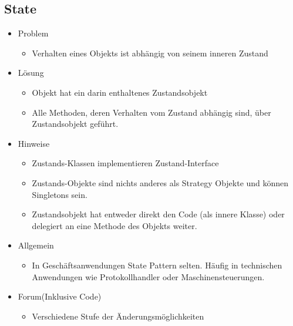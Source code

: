\documentclass[../ZF_SWEN1.tex]{subfiles}
\begin{document}
\subsection{State}
\begin{itemize}
	\item Problem
	\begin{itemize}
		\item Verhalten eines Objekts ist abhängig von seinem inneren Zustand
	\end{itemize}
	\item Lösung
	\begin{itemize}
		\item Objekt hat ein darin enthaltenes Zustandsobjekt
		\item Alle Methoden, deren Verhalten vom Zustand abhängig sind, über Zustandsobjekt geführt.
	\end{itemize}
	\item Hinweise
	\begin{itemize}
		\item Zustands-Klassen implementieren Zustand-Interface
		\item Zustands-Objekte sind nichts anderes als Strategy Objekte und können Singletons sein.
		\item Zustandsobjekt hat entweder direkt den Code (als innere Klasse) oder delegiert an eine Methode des Objekts weiter.
	\end{itemize}
	\item Allgemein
	\begin{itemize}
		\item In Geschäftsanwendungen State Pattern selten. Häufig in technischen Anwendungen wie Protokollhandler oder Maschinensteuerungen.
	\end{itemize}
	\item Forum(Inklusive Code)
	\begin{itemize}
		\item Verschiedene Stufe der Änderungsmöglichkeiten
	\end{itemize}
\end{itemize}
\end{document}
